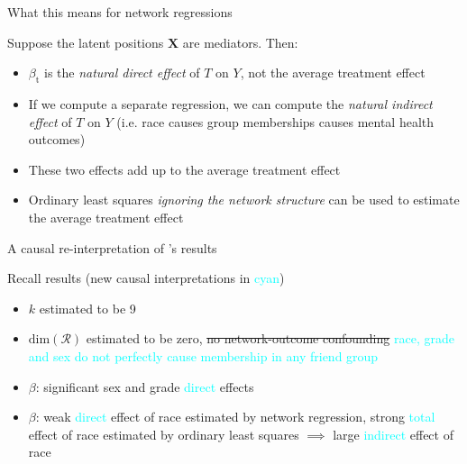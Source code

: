 \documentclass{beamer}
\theoremstyle{remark}
\newcommand{\X}{\bm X}
\newcommand{\betat}{\beta_\text{t}}
\begin{document}
\begin{frame}{What this means for network regressions}

    Suppose the latent positions $\X$ are mediators. Then:

    \begin{itemize}
        \item $\betat$ is the \emph{natural direct effect} of $T$ on $Y$, not the average treatment effect
        \item If we compute a separate regression, we can compute the \emph{natural indirect effect} of $T$ on $Y$ (i.e. race causes group memberships causes mental health outcomes)
        \item These two effects add up to the average treatment effect
        \item Ordinary least squares \emph{ignoring the network structure} can be used to estimate the average treatment effect
    \end{itemize}

\end{frame}

\begin{frame}{A causal re-interpretation of \cite{le_linear_2021}'s results}

    Recall results (new causal interpretations in \textcolor{cyan}{cyan})

    \begin{itemize}
        \item $k$ estimated to be 9
        \item $\mathrm{dim}(\mathcal R)$ estimated to be zero, \sout{no network-outcome confounding} \textcolor{cyan}{race, grade and sex do not perfectly cause membership in any friend group}
        \item $\beta$: significant sex and grade \textcolor{cyan}{direct} effects
        \item $\beta$: weak \textcolor{cyan}{direct} effect of race estimated by network regression, strong \textcolor{cyan}{total} effect of race estimated by ordinary least squares $\implies$ large \textcolor{cyan}{indirect} effect of race
    \end{itemize}

\end{frame}
\end{document}
